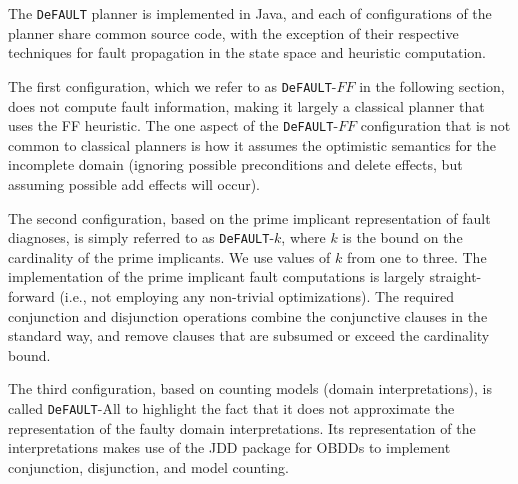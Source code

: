\documentclass{article}
\def\und#1{\noindent{\bf #1}:}
\def\FFRISKY{{\tt DeFAULT}}
\def\und#1{\medskip{\noindent\bf #1:}}
\begin{document}
\und{\FFRISKY{} Implementation}The \FFRISKY{} planner is implemented in Java, and each of configurations of the planner share common source code, with the exception of their respective techniques for fault propagation in the state space and heuristic computation.  

The first configuration, which we refer to as \FFRISKY{}-$FF$ in the following section, does not compute fault information, making it largely a classical planner that uses the FF heuristic.  The one aspect of the \FFRISKY{}-$FF$ configuration that is not common to classical planners is how it assumes the optimistic semantics for the incomplete domain (ignoring possible preconditions and delete effects, but assuming possible add effects will occur).  

The second configuration, based on the prime implicant representation of fault diagnoses, is simply referred to as \FFRISKY{}-$k$, where $k$ is the bound on the cardinality of the prime implicants.  We use values of $k$ from one to three.  The implementation of the prime implicant fault computations is largely straight-forward (i.e., not employing any non-trivial optimizations).  The required conjunction and disjunction operations combine the conjunctive clauses in the standard way, and remove clauses that are subsumed or exceed the cardinality bound.

The third configuration, based on counting models (domain interpretations), is called \FFRISKY{}-All to highlight the fact that it does not approximate the representation of the faulty domain interpretations.  Its representation of the interpretations makes use of the JDD \cite{jdd} package for OBDDs to implement conjunction, disjunction, and model counting.
\end{document}
